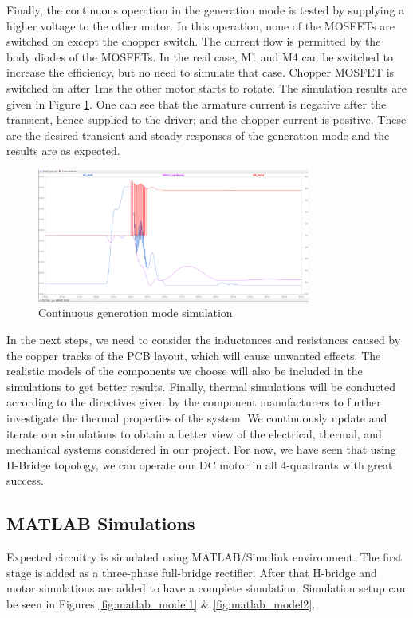 Finally, the continuous operation in the generation mode is tested by supplying a higher voltage to the other motor. In this operation, none of the MOSFETs are switched on except the chopper switch. The current flow is permitted by the body diodes of the MOSFETs. In the real case, M1 and M4 can be switched to increase the efficiency, but no need to simulate that case. Chopper MOSFET is switched on after 1ms the other motor starts to rotate. The simulation results are given in Figure \ref{fig:LTspice_generation}. One can see that the armature current is negative after the transient, hence supplied to the driver; and the chopper current is positive. These are the desired transient and steady responses of the generation mode and the results are as expected. \\

\begin{figure}[H]
    \centering
    \includegraphics[width=0.8\textwidth]{Figures/Spice_Figures/Generating_Mode_Start.PNG}
    \caption{Continuous generation mode simulation}   
    \label{fig:LTspice_generation}
\end{figure}

In the next steps, we need to consider the inductances and resistances caused by the copper tracks of the PCB layout, which will cause unwanted effects. The realistic models of the components we choose will also be included in the simulations to get better results. Finally, thermal simulations will be conducted according to the directives given by the component manufacturers to further investigate the thermal properties of the system. We continuously update and iterate our simulations to obtain a better view of the electrical, thermal, and mechanical systems considered in our project. For now, we have seen that using H-Bridge topology, we can operate our DC motor in all 4-quadrants with great success.


\subsection{MATLAB Simulations}
Expected circuitry is simulated using MATLAB/Simulink environment. The first stage is added as a three-phase full-bridge rectifier. After that H-bridge and motor simulations are added to have a complete simulation. Simulation setup can be seen in Figures \ref{fig:matlab_model1} \&
\ref{fig:matlab_model2}.

